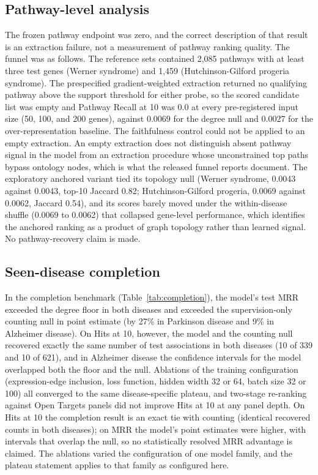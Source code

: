 \documentclass[11pt]{article}
\begin{document}
\subsection{Pathway-level analysis}

The frozen pathway endpoint was zero, and the correct description of that result is an extraction failure, not a measurement of pathway ranking quality. The funnel was as follows. The reference sets contained 2,085 pathways with at least three test genes (Werner syndrome) and 1,459 (Hutchinson-Gilford progeria syndrome). The prespecified gradient-weighted extraction returned no qualifying pathway above the support threshold for either probe, so the scored candidate list was empty and Pathway Recall at 10 was 0.0 at every pre-registered input size (50, 100, and 200 genes), against 0.0069 for the degree null and 0.0027 for the over-representation baseline. The faithfulness control could not be applied to an empty extraction. An empty extraction does not distinguish absent pathway signal in the model from an extraction procedure whose unconstrained top paths bypass ontology nodes, which is what the released funnel reports document. The exploratory anchored variant tied its topology null (Werner syndrome, 0.0043 against 0.0043, top-10 Jaccard 0.82; Hutchinson-Gilford progeria, 0.0069 against 0.0062, Jaccard 0.54), and its scores barely moved under the within-disease shuffle (0.0069 to 0.0062) that collapsed gene-level performance, which identifies the anchored ranking as a product of graph topology rather than learned signal. No pathway-recovery claim is made.

\subsection{Seen-disease completion}

In the completion benchmark (Table~\ref{tab:completion}), the model's test MRR exceeded the degree floor in both diseases and exceeded the supervision-only counting null in point estimate (by 27\% in Parkinson disease and 9\% in Alzheimer disease). On Hits at 10, however, the model and the counting null recovered exactly the same number of test associations in both diseases (10 of 339 and 10 of 621), and in Alzheimer disease the confidence intervals for the model overlapped both the floor and the null. Ablations of the training configuration (expression-edge inclusion, loss function, hidden width 32 or 64, batch size 32 or 100) all converged to the same disease-specific plateau, and two-stage re-ranking against Open Targets panels did not improve Hits at 10 at any panel depth. On Hits at 10 the completion result is an exact tie with counting (identical recovered counts in both diseases); on MRR the model's point estimates were higher, with intervals that overlap the null, so no statistically resolved MRR advantage is claimed. The ablations varied the configuration of one model family, and the plateau statement applies to that family as configured here.
\end{document}

